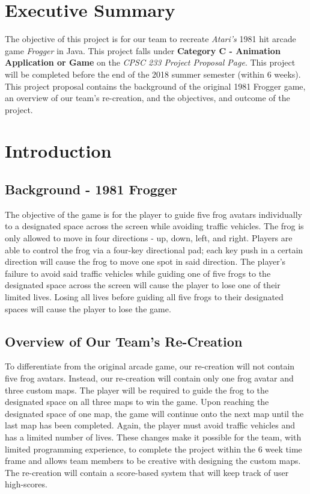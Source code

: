 \documentclass{article}
\begin{document}
\section{Executive Summary}
The objective of this project is for our team to recreate \textit{Atari's} 1981 hit arcade game \textit{Frogger} in Java. This project falls under \textbf{Category C - Animation Application or Game} on the \textit{CPSC 233 Project Proposal Page}. This project will be completed before the end of the 2018 summer semester (within 6 weeks). This project proposal contains the background of the original 1981 Frogger game, an overview of our team's re-creation, and the objectives, and outcome of the project.

\section{Introduction}
\subsection{Background - 1981 Frogger}
The objective of the game is for the player to guide five frog avatars individually to a designated space across the screen while avoiding traffic vehicles. The frog is only allowed to move in four directions - up, down, left, and right. Players are able to control the frog via a four-key directional pad; each key push in a certain direction will cause the frog to move one spot in said direction. The player's failure to avoid said traffic vehicles while guiding one of five frogs to the designated space across the screen will cause the player to lose one of their limited lives. Losing all lives before guiding all five frogs to their designated spaces will cause the player to lose the game.

\subsection{Overview of Our Team's Re-Creation}
To differentiate from the original arcade game, our re-creation will not contain five frog avatars. Instead, our re-creation will contain only one frog avatar and three custom maps. The player will be required to guide the frog to the designated space on all three maps to win the game. Upon reaching the designated space of one map, the game will continue onto the next map until the last map has been completed. Again, the player must avoid traffic vehicles and has a limited number of lives. These changes make it possible for the team, with limited programming experience, to complete the project within the 6 week time frame and allows team members to be creative with designing the custom maps. The re-creation will contain a score-based system that will keep track of user high-scores.
\end{document}
